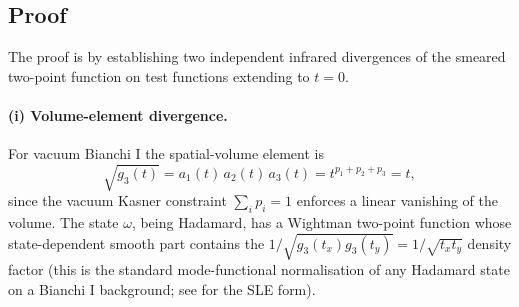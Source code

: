 \documentclass[11pt,a4paper]{article}
\theoremstyle{definition}
\begin{document}
\subsection*{Proof}

The proof is by establishing two independent infrared divergences of the
smeared two-point function on test functions extending to $t=0$.

\paragraph{(i) Volume-element divergence.}

For vacuum Bianchi I the spatial-volume element is
\begin{equation}
  \sqrt{g_3(t)} = a_1(t)\,a_2(t)\,a_3(t) = t^{p_1+p_2+p_3} = t,
\end{equation}
since the vacuum Kasner constraint $\sum_i p_i = 1$ enforces a linear
vanishing of the volume. The state $\omega$, being Hadamard, has a Wightman
two-point function whose state-dependent smooth part contains the
$1/\sqrt{g_3(t_x)g_3(t_y)} = 1/\sqrt{t_x t_y}$ density factor (this is the
standard mode-functional normalisation of any Hadamard state on a Bianchi
I background; see \cite[\S3]{BanerjeeNiedermaier2023} for the SLE form).
\end{document}
